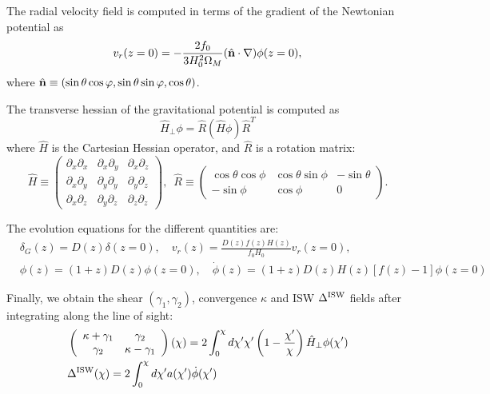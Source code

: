 \documentclass[a4paper,10pt]{article}
\newcommand{\nv}{\hat{\bf n}}
\begin{document}
  The radial velocity field is computed in terms of the gradient of the Newtonian
  potential as
  \begin{equation}
    v_r(z=0)=-\frac{2f_0}{3H_0^2\Omega_M}(\nv\cdot\nabla)\phi(z=0),
  \end{equation}
  where $\nv\equiv(\sin\theta\cos\varphi,\sin\theta\sin\varphi,\cos\theta)$.

  The transverse hessian of the gravitational potential is computed as
  \begin{equation}
    \hat{H}_\perp\phi=\hat{R}(\hat{H}\phi)\hat{R}^T
  \end{equation}
  where $\hat{H}$ is the Cartesian Hessian operator, and $\hat{R}$ is a rotation
  matrix:
  \begin{equation}
    \hat{H}\equiv\left(
    \begin{array}{ccc}
      \partial_x\partial_x & \partial_x\partial_y & \partial_x\partial_z\\
      \partial_x\partial_y & \partial_y\partial_y & \partial_y\partial_z\\
      \partial_x\partial_z & \partial_y\partial_z & \partial_z\partial_z
    \end{array}\right),
    \hspace{6pt}
    \hat{R}\equiv\left(
    \begin{array}{ccc}
      \cos\theta\cos\phi & \cos\theta\sin\phi & -\sin\theta\\
      -\sin\phi & \cos\phi & 0
    \end{array}
    \right).
  \end{equation}

  The evolution equations for the different quantities are:
  \begin{align}
    &\delta_G(z)=D(z)\delta(z=0),\hspace{12pt}
    v_r(z)=\frac{D(z)f(z)H(z)}{f_0H_0}v_r(z=0),\\
    &\phi(z)=(1+z)D(z)\phi(z=0),\hspace{12pt}
    \dot{\phi}(z)=(1+z)D(z)H(z)[f(z)-1]\phi(z=0)
  \end{align}

  Finally, we obtain the shear $(\gamma_1,\gamma_2)$, convergence $\kappa$
  and ISW $\Delta^{\rm ISW}$ fields after integrating along the line
  of sight:
  \begin{align}
    &\left(
    \begin{array}{cc}
      \kappa+\gamma_1 & \gamma_2\\
      \gamma_2 & \kappa-\gamma_1
    \end{array}\right)(\chi)=
    2\int_0^\chi d\chi'\chi'\left(1-\frac{\chi'}{\chi}\right)\hat{H}_\perp\phi(\chi')\\
    &\Delta^{\rm ISW}(\chi)=2\int_0^\chi d\chi'a(\chi')\dot{\phi}(\chi')
  \end{align}    
\end{document}
